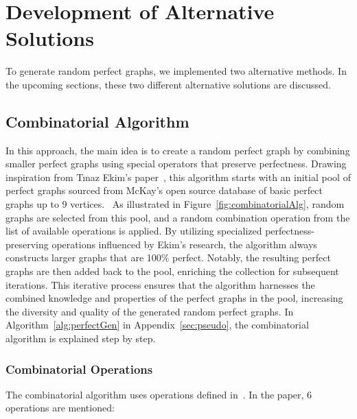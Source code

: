 \section{Development of Alternative Solutions}
To generate random perfect graphs, we implemented two alternative methods. In the upcoming sections, these two different alternative solutions are discussed.

\subsection{Combinatorial Algorithm}

In this approach, the main idea is to create a random perfect graph by combining smaller perfect graphs using special operators that preserve perfectness. Drawing inspiration from Tınaz Ekim's paper~\cite{tinaz}, this algorithm starts with an initial pool of perfect graphs sourced from McKay's open source database of basic perfect graphs up to 9 vertices.~\cite{mckay} As illustrated in Figure~\ref{fig:combinatorialAlg}, random graphs are selected from this pool, and a random combination operation from the list of available operations is applied. By utilizing specialized perfectness-preserving operations influenced by Ekim's research, the algorithm always constructs larger graphs that are 100\% perfect. Notably, the resulting perfect graphs are then added back to the pool, enriching the collection for subsequent iterations. This iterative process ensures that the algorithm harnesses the combined knowledge and properties of the perfect graphs in the pool, increasing the diversity and quality of the generated random perfect graphs. In Algorithm~\ref{alg:perfectGen} in Appendix~\ref{sec:pseudo}, the combinatorial algorithm is explained step by step.



\subsubsection{Combinatorial Operations}

The combinatorial algorithm uses operations defined in~\cite{tinaz}. In the paper, 6 operations are mentioned:

